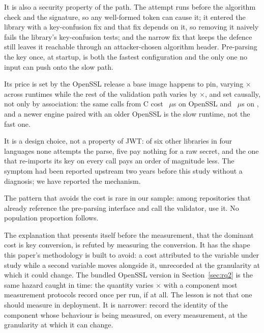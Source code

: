 \documentclass[preprint,12pt,authoryear]{elsarticle}
\begin{document}
It is also a security property of the path. The attempt runs before the
algorithm check and the signature, so any well-formed token can cause it; it
entered the library with a key-confusion fix and that fix depends on it, so
removing it naively fails the library's key-confusion tests; and the narrow fix
that keeps the defence still leaves it reachable through an attacker-chosen
algorithm header. Pre-parsing the key once, at startup, is both the fastest
configuration and the only one no input can push onto the slow path.

Its price is set by the OpenSSL release a base image happens to pin, varying
\SpanProbeThrows$\times$ across runtimes while the rest of the validation path
varies by \SpanJwtPreparsed$\times$, and set causally, not only by
association: the same calls from C cost \CFullVThreeZeroSixteen~$\mu$s on
OpenSSL \CVersionLiteralVThreeZeroSixteen{} and \CFullVThreeFiveEight~$\mu$s on \CVersionLiteralVThreeFiveEight, and a newer engine
paired with an older OpenSSL is the slow runtime, not the fast one.

It is a design choice, not a property of JWT: of six other libraries in four
languages none attempts the parse, five pay nothing for a raw secret, and the
one that re-imports its key on every call pays an order of magnitude less. The symptom had been reported upstream two
years before this study without a diagnosis; we have reported the mechanism.

The pattern that avoids the cost is rare in our sample: among
\CounterReposWithVerify{} repositories that already reference the pre-parsing
interface and call the validator, \AdjudicatedGenuineProjects{} use it. No
population proportion follows.

The explanation that presents itself before the measurement, that the
dominant cost is key conversion, is refuted by measuring the conversion. It
has the shape this paper's methodology is built to avoid: a cost attributed to the
variable under study while a second variable moves alongside it, unrecorded at
the granularity at which it could change. The bundled OpenSSL version in
Section~\ref{sec:rq2} is the same hazard caught in time: the quantity varies
\SpanProbeThrows$\times$ with a component most measurement protocols record once
per run, if at all. The lesson is not that one should measure in deployment. It
is narrower: record the identity of the component whose behaviour is being
measured, on every measurement, at the granularity at which it can change.

\end{document}
